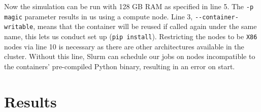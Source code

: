 Now the simulation can be run with 128 GB RAM as specified in line 5. 
The \verb|-p magic| parameter results in us using a compute node. 
Line 3, \verb|--container-writable|, means that the container will be reused if called again under the same name, this lets us conduct set up  (\verb|pip install|).
Restricting the nodes to be \verb|X86| nodes via line 10 is necessary as there are other architectures available in the cluster. 
Without this line, Slurm can schedule our jobs on nodes incompatible to the containers' pre-compiled Python binary, resulting in an error on start.

\section{Results}

